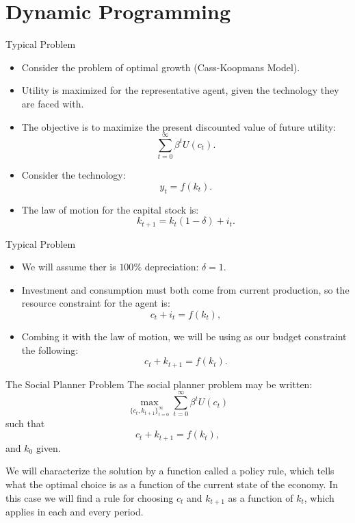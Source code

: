 \documentclass{beamer}
\begin{document}
\section{Dynamic Programming }
\begin{frame}{Typical Problem }
    \begin{itemize}
        \item Consider the problem of optimal growth (Cass-Koopmans Model). 
        \item Utility is maximized for the representative agent, given the technology they are faced with. 
        \item The objective is to maximize the present discounted value of future utility:
        \[\sum_{t=0}^\infty \beta^t U(c_t).
        \]
        \item Consider the technology:
        \[y_t=f(k_t).
        \]
        \item The law of motion for the capital stock is:
        \[k_{t+1}=k_t(1-\delta)+i_t.
        \]
    \end{itemize}
        
\end{frame}


\begin{frame}{Typical Problem }
\begin{itemize}
    \item We will assume ther is $100\%$ depreciation: $\delta=1$.
    \item Investment and consumption must both come from current production, so the resource constraint for the agent is: 
    \[c_t+i_t=f(k_t), 
    \]
    \item Combing it with the law of motion, we will be using as our budget constraint the following:
    \[c_t+k_{t+1}=f(k_t).
    \]
\end{itemize}
\end{frame}
\begin{frame}{The Social Planner Problem}
    The social planner problem may be written:
    \[\max_{\{c_t, k_{t+1}\}_{t=0}^\infty} \sum_{t=0}^\infty \beta^t U(c_t)
    \]
    such that 
     \[c_t+k_{t+1}=f(k_t),
    \]
    and $k_0$ given.
    \par We will characterize the solution by a function called a policy rule, which tells what the optimal choice is as a function of the current state of the economy. In this case we will find a rule for choosing $c_t$ and $k_{t+1}$ as a function of $k_t$, which applies in each and every period. 
\end{frame}
\end{document}
